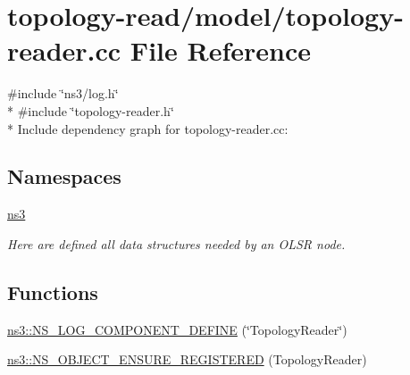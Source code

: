\hypertarget{topology-reader_8cc}{}\section{topology-\/read/model/topology-\/reader.cc File Reference}
\label{topology-reader_8cc}
{\ttfamily \#include \char`\"{}ns3/log.\+h\char`\"{}}\\*
{\ttfamily \#include \char`\"{}topology-\/reader.\+h\char`\"{}}\\*
Include dependency graph for topology-\/reader.cc\+:
\subsection*{Namespaces}
\begin{DoxyCompactItemize}
\item 
 \hyperlink{namespacens3}{ns3}
\begin{DoxyCompactList}\small\item\em Here are defined all data structures needed by an O\+L\+SR node. \end{DoxyCompactList}\end{DoxyCompactItemize}
\subsection*{Functions}
\begin{DoxyCompactItemize}
\item 
\hyperlink{namespacens3_a801e47870cfb6446792d01790f355b17}{ns3\+::\+N\+S\+\_\+\+L\+O\+G\+\_\+\+C\+O\+M\+P\+O\+N\+E\+N\+T\+\_\+\+D\+E\+F\+I\+NE} (\char`\"{}Topology\+Reader\char`\"{})
\item 
\hyperlink{namespacens3_a5ad3f29b39524ef237ecffb2d12e40db}{ns3\+::\+N\+S\+\_\+\+O\+B\+J\+E\+C\+T\+\_\+\+E\+N\+S\+U\+R\+E\+\_\+\+R\+E\+G\+I\+S\+T\+E\+R\+ED} (Topology\+Reader)
\end{DoxyCompactItemize}
